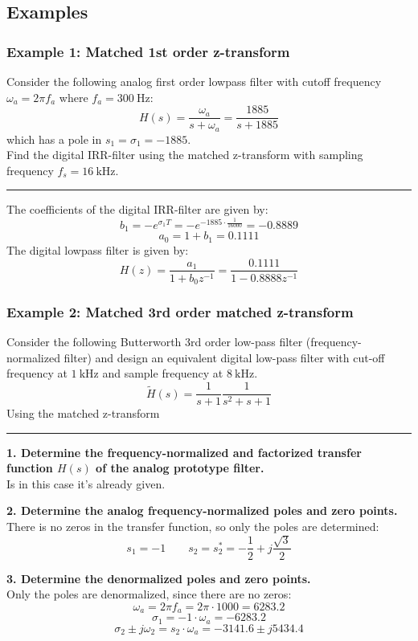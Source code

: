 \subsection{Examples}
\subsubsection{Example 1: Matched 1st order z-transform}
Consider the following analog first order lowpass filter with cutoff frequency $\omega_a=2\pi f_a$ where $f_a=\SI{300}{\hertz}$:
$$H(s)=\frac{\omega_a}{s+\omega_a}=\frac{1885}{s+1885}$$
which has a pole in $s_1=\sigma_1=-1885$.\\
Find the digital IRR-filter using the matched z-transform with sampling frequency $f_s=\SI{16}{\kilo\hertz}$.

\rule{\textwidth}{0.5pt}

The coefficients of the digital IRR-filter are given by:
$$b_1=-e^{\sigma_1 T}=-e^{-1885\cdot\frac{1}{16000}}=-0.8889$$
$$a_0=1+b_1=0.1111$$
The digital lowpass filter is given by:
$$H(z)=\frac{a_1}{1+b_0z^{-1}}=\frac{0.1111}{1-0.8888z^{-1}}$$

\subsubsection{Example 2: Matched 3rd order matched z-transform}
Consider the following Butterworth 3rd order low-pass filter (frequency-normalized filter) 
and design an equivalent digital low-pass filter with cut-off frequency at $\SI{1}{\kilo\hertz}$ and sample frequency at $\SI{8}{\kilo\hertz}$. 
$${\tilde{H}}(s)=\frac{1}{s+1}\frac{1}{s^{2}+s+1}$$
Using the matched z-transform

\rule{\textwidth}{0.5pt}

\textbf{1. Determine the frequency-normalized and factorized transfer function $H(s)$ of the analog prototype filter.}\\
Is in this case it's already given.

\textbf{2. Determine the analog frequency-normalized poles and zero points.}\\
There is no zeros in the transfer function, so only the poles are determined:
$$s_1=-1 \qquad s_2=s_2^*=-\frac{1}{2}+j\frac{\sqrt{3}}{2}$$

\textbf{3. Determine the denormalized poles and zero points.}\\
Only the poles are denormalized, since there are no zeros:
$$\omega_a=2\pi f_a=2\pi\cdot 1000=6283.2$$
$$\sigma_1=-1\cdot\omega_a=-6283.2$$
$$\sigma_2\pm j\omega_2=s_2\cdot\omega_a=-3141.6\pm j5434.4$$

